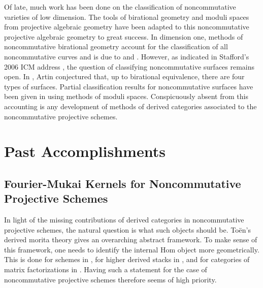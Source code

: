 \documentclass[11pt]{article}
\begin{document}
Of late, much work has been done on the classification of noncommutative varieties of low dimension.
The tools of birational geometry and moduli spaces from projective algebraic geometry have been adapted to this noncommutative projective algebraic geometry to great success.
In dimension one, methods of noncommutative birational geometry account for the classification of all noncommutative curves and is due to \cite{AS95} and \cite{Reiten-VdB}.
However, as indicated in Stafford's 2006 ICM address \cite{Stafford02}, the question of classifying noncommutative surfaces remains open.
In \cite{ArtinConj}, Artin conjectured that, up to birational equivalence, there are four types of surfaces.
Partial classification results for noncommutative surfaces have been given in \cite{ATV,Stephenson96,Stephenson97} using methods of moduli spaces.
Conspicuously absent from this accounting is any development of methods of derived categories associated to the noncommutative projective schemes.
\section{Past Accomplishments}

\subsection{Fourier-Mukai Kernels for Noncommutative Projective Schemes}
In light of the missing contributions of derived categories in noncommutative projective schemes, the natural question is what such objects should be.
To\"en's derived morita theory \cite{Toen} gives an overarching abstract framework.
To make sense of this framework, one needs to identify the internal Hom object more geometrically.
This is done for schemes in \cite{Toen}, for higher derived stacks in \cite{BFN}, and for categories of matrix factorizations in \cite{dyck,PV,BFK}.
Having such a statement for the case of noncommutative projective schemes therefore seems of high priority.
\end{document}
